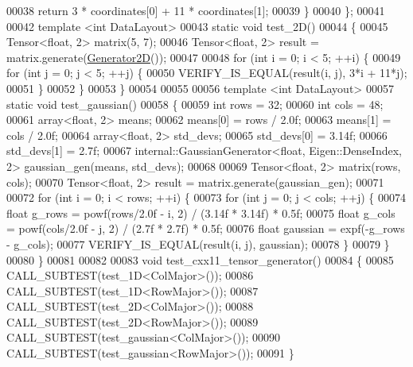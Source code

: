 \begin{DoxyCode}
00038     \textcolor{keywordflow}{return} 3 * coordinates[0] + 11 * coordinates[1];
00039   \}
00040 \};
00041 
00042 \textcolor{keyword}{template} <\textcolor{keywordtype}{int} DataLayout>
00043 \textcolor{keyword}{static} \textcolor{keywordtype}{void} test\_2D()
00044 \{
00045   Tensor<float, 2> matrix(5, 7);
00046   Tensor<float, 2> result = matrix.generate(\hyperlink{struct_generator2_d}{Generator2D}());
00047 
00048   \textcolor{keywordflow}{for} (\textcolor{keywordtype}{int} i = 0; i < 5; ++i) \{
00049     \textcolor{keywordflow}{for} (\textcolor{keywordtype}{int} j = 0; j < 5; ++j) \{
00050       VERIFY\_IS\_EQUAL(result(i, j), 3*i + 11*j);
00051     \}
00052   \}
00053 \}
00054 
00055 
00056 \textcolor{keyword}{template} <\textcolor{keywordtype}{int} DataLayout>
00057 \textcolor{keyword}{static} \textcolor{keywordtype}{void} test\_gaussian()
00058 \{
00059   \textcolor{keywordtype}{int} rows = 32;
00060   \textcolor{keywordtype}{int} cols = 48;
00061   array<float, 2> means;
00062   means[0] = rows / 2.0f;
00063   means[1] = cols / 2.0f;
00064   array<float, 2> std\_devs;
00065   std\_devs[0] = 3.14f;
00066   std\_devs[1] = 2.7f;
00067   internal::GaussianGenerator<float, Eigen::DenseIndex, 2> gaussian\_gen(means, std\_devs);
00068 
00069   Tensor<float, 2> matrix(rows, cols);
00070   Tensor<float, 2> result = matrix.generate(gaussian\_gen);
00071 
00072   \textcolor{keywordflow}{for} (\textcolor{keywordtype}{int} i = 0; i < rows; ++i) \{
00073     \textcolor{keywordflow}{for} (\textcolor{keywordtype}{int} j = 0; j < cols; ++j) \{
00074       \textcolor{keywordtype}{float} g\_rows = powf(rows/2.0f - i, 2) / (3.14f * 3.14f) * 0.5f;
00075       \textcolor{keywordtype}{float} g\_cols = powf(cols/2.0f - j, 2) / (2.7f * 2.7f) * 0.5f;
00076       \textcolor{keywordtype}{float} gaussian = expf(-g\_rows - g\_cols);
00077       VERIFY\_IS\_EQUAL(result(i, j), gaussian);
00078     \}
00079   \}
00080 \}
00081 
00082 
00083 \textcolor{keywordtype}{void} test\_cxx11\_tensor\_generator()
00084 \{
00085   CALL\_SUBTEST(test\_1D<ColMajor>());
00086   CALL\_SUBTEST(test\_1D<RowMajor>());
00087   CALL\_SUBTEST(test\_2D<ColMajor>());
00088   CALL\_SUBTEST(test\_2D<RowMajor>());
00089   CALL\_SUBTEST(test\_gaussian<ColMajor>());
00090   CALL\_SUBTEST(test\_gaussian<RowMajor>());
00091 \}
\end{DoxyCode}
